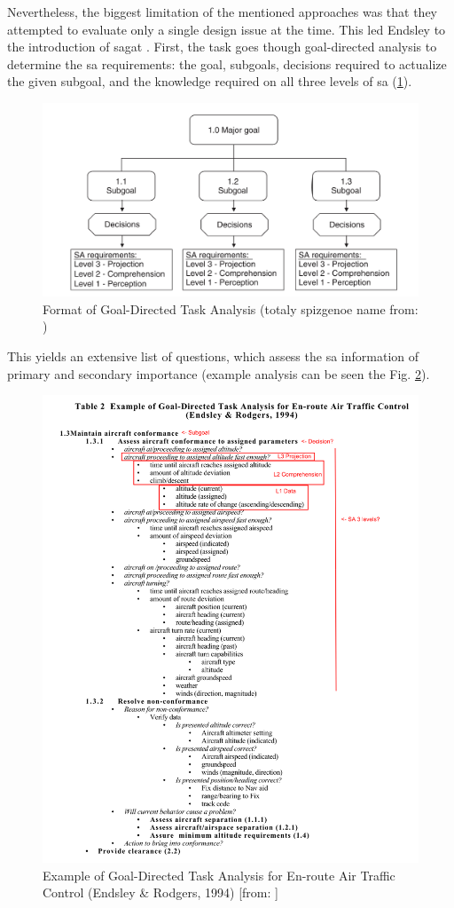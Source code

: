 Nevertheless, the biggest limitation of the mentioned approaches was that they attempted to evaluate only a single design issue at the time. This led Endsley to the introduction of \gls{sagat} \cite{endsley_situation_1988}. First, the task goes though goal-directed analysis to determine the \gls{sa} requirements: the goal, subgoals, decisions required to actualize the given subgoal, and the knowledge required on all three levels of \gls{sa} (\ref{fig:sagoalorientedtaskanalysis}).
\begin{figure}
	\centering
	\includegraphics[width=0.7\linewidth]{figures/placeholders/SA_goal_oriented_task_analysis}
	\caption{Format of Goal-Directed Task Analysis (totaly spizgenoe name from: \cite{endsley_direct_nodate})}
	\label{fig:sagoalorientedtaskanalysis}
\end{figure}
This yields an extensive list of questions, which assess the \gls{sa} information of primary and secondary importance (example analysis can be seen the Fig. \ref{fig:sagoalorientedtaskanalysisresultexample}).
\begin{figure}
	\centering
	\includegraphics[width=0.7\linewidth]{figures/placeholders/SA_goal_oriented_task_analysis_result_example}
	\caption{Example of Goal-Directed Task Analysis for En-route Air Traffic Control (Endsley \& Rodgers, 1994) [from: \cite{endsley_direct_nodate}]}
	\label{fig:sagoalorientedtaskanalysisresultexample}
\end{figure}
